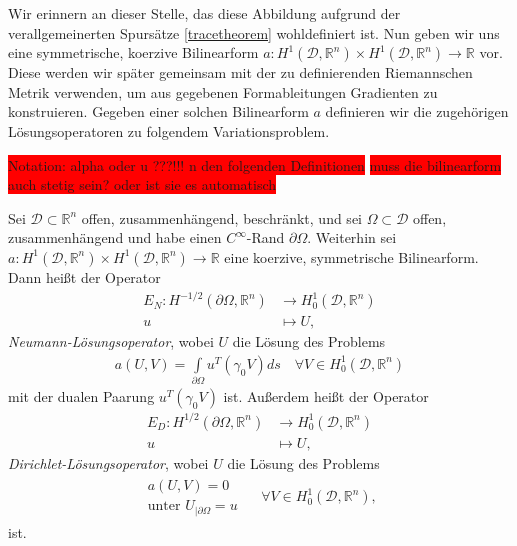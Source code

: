 Wir erinnern an dieser Stelle, das diese Abbildung aufgrund der verallgemeinerten Spursätze \ref{tracetheorem} wohldefiniert ist. Nun geben wir uns eine symmetrische, koerzive Bilinearform $a: H^1(\mathcal{D}, \mathbb{R}^n)\times H^1(\mathcal{D}, \mathbb{R}^n) \rightarrow \mathbb{R}$ vor. Diese werden wir später gemeinsam mit der zu definierenden Riemannschen Metrik verwenden, um aus gegebenen Formableitungen Gradienten zu konstruieren. Gegeben einer solchen Bilinearform $a$ definieren wir die zugehörigen Lösungsoperatoren zu folgendem Variationsproblem.

\colorbox{red}{Notation: alpha oder u ???!!! n den folgenden Definitionen} \newline
\colorbox{red}{muss die bilinearform auch stetig sein? oder ist sie es automatisch}

\begin{defi}[Lösungsoperatoren]\label{Llsgsoperatoren}
Sei $\mathcal{D}\subset\mathbb{R}^n$ offen, zusammenhängend, beschränkt, und sei $\Omega\subset \mathcal{D}$ offen, zusammenhängend und habe einen $C^\infty$-Rand $\partial\Omega$.
Weiterhin sei $a: H^1(\mathcal{D}, \mathbb{R}^n)\times H^1(\mathcal{D}, \mathbb{R}^n) \rightarrow \mathbb{R}$ eine koerzive, symmetrische Bilinearform. Dann heißt der Operator 
\begin{align*}
	E_N: H^{-1/2}(\partial\Omega, \mathbb{R}^n) &\rightarrow H^{1}_0(\mathcal{D}, \mathbb{R}^n) \\
	u &\mapsto U,
\end{align*}
\textit{Neumann-Lösungsoperator}, wobei $U$ die Lösung des Problems
\begin{align*}
	a(U,V) = \underset{\partial\Omega}{\int}u^T(\gamma_0 V)ds \quad \forall V \in H^1_0(\mathcal{D},\mathbb{R}^n)
\end{align*}
mit der dualen Paarung $u^T(\gamma_0 V)$ ist. Außerdem heißt der Operator
\begin{align*}
	E_D: H^{1/2}(\partial\Omega, \mathbb{R}^n) &\rightarrow H^{1}_0(\mathcal{D}, \mathbb{R}^n) \\
	u &\mapsto U,
\end{align*}
\textit{Dirichlet-Lösungsoperator}, wobei $U$ die Lösung des Problems
\begin{align*}
	\begin{matrix} a(U,V) = 0 \\
	\text{unter } U_{\vert \partial\Omega} = u 
	\end{matrix} \quad\; \forall V \in H^1_0(\mathcal{D},\mathbb{R}^n),
\end{align*}
ist.
\end{defi}

